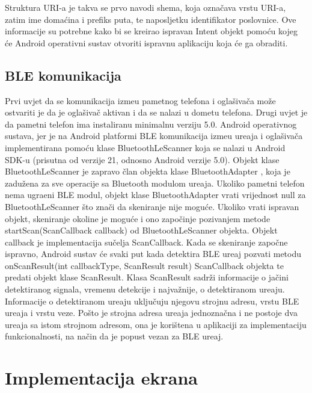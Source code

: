 Struktura URI-a je takva se prvo navodi shema, koja ozna\v{c}ava vrstu URI-a, zatim ime doma\'{c}ina i prefiks puta, te naposljetku identifikator poslovnice. Ove informacije su potrebne kako bi se kreirao ispravan Intent objekt pomo\'{c}u kojeg \'{c}e Android operativni sustav otvoriti ispravnu aplikaciju koja \'{c}e ga obraditi.

\subsection{BLE komunikacija}

Prvi uvjet da se komunikacija izme\dj u pametnog telefona i ogla\v{s}iva\v{c}a mo\v{z}e ostvariti je da je ogla\v{s}iva\v{c} aktivan i da se nalazi u dometu telefona. Drugi uvjet je da pametni telefon ima instaliranu minimalnu verziju 5.0. Android operativnog sustava, jer je na Android platformi BLE komunikacija izme\dj u ure\dj aja i ogla\v{s}iva\v{c}a implementirana pomo\'{c}u klase BluetoothLeScanner \cite{bluetoothLeScaner} koja se nalazi u Android SDK-u (prisutna od verzije 21, odnosno Android verzije 5.0).
Objekt klase BluetoothLeScanner je zapravo \v{c}lan objekta klase BluetoothAdapter \cite{bluetoothAdapter}, koja je zadu\v{z}ena za sve operacije sa Bluetooth modulom ure\dj aja. Ukoliko pametni telefon nema ugra\dj eni BLE modul, objekt klase BluetoothAdapter vrati vrijednost null za BluetoothLeScanner \v{s}to zna\v{c}i da skeniranje nije mogu\'{c}e. Ukoliko vrati ispravan objekt, skeniranje okoline je mogu\'{c}e i ono zapo\v{c}inje pozivanjem metode startScan(ScanCallback callback) od BluetoothLeScanner objekta. Objekt callback je implementacija su\v{c}elja ScanCallback. Kada se skeniranje zapo\v{c}ne ispravno, Android sustav \'{c}e svaki put kada detektira BLE ure\dj aj pozvati metodu onScanResult(int callbackType, ScanResult result) ScanCallback objekta te predati objekt klase ScanResult. Klasa ScanResult sadr\v{z}i informacije o ja\v{c}ini detektiranog signala, vremenu detekcije i najva\v{z}nije, o detektiranom ure\dj aju. Informacije o detektiranom ure\dj aju uklju\v{c}uju njegovu strojnu adresu, vrstu BLE ure\dj aja i vrstu veze. Po\v{s}to je strojna adresa ure\dj aja jednozna\v{c}na i ne postoje dva ure\dj aja sa istom strojnom adresom, ona je kori\v{s}tena u aplikaciji za implementaciju funkcionalnosti, na na\v{c}in da je popust vezan za BLE ure\dj aj.


\section{Implementacija ekrana}

